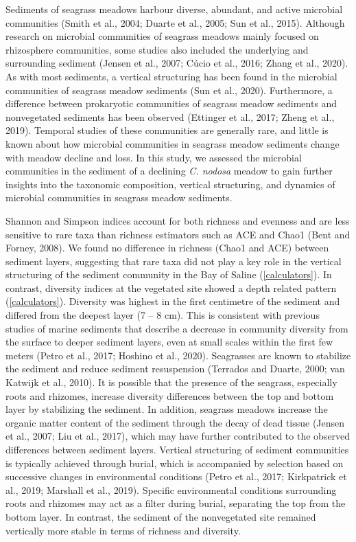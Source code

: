 \documentclass[12pt,]{article}
\begin{document}
Sediments of seagrass meadows harbour diverse, abundant, and active
microbial communities (Smith et al., 2004; Duarte et al., 2005; Sun et
al., 2015). Although research on microbial communities of seagrass
meadows mainly focused on rhizosphere communities, some studies also
included the underlying and surrounding sediment (Jensen et al., 2007;
Cúcio et al., 2016; Zhang et al., 2020). As with most sediments, a
vertical structuring has been found in the microbial communities of
seagrass meadow sediments (Sun et al., 2020). Furthermore, a difference
between prokaryotic communities of seagrass meadow sediments and
nonvegetated sediments has been observed (Ettinger et al., 2017; Zheng
et al., 2019). Temporal studies of these communities are generally rare,
and little is known about how microbial communities in seagrass meadow
sediments change with meadow decline and loss. In this study, we
assessed the microbial communities in the sediment of a declining
\emph{C. nodosa} meadow to gain further insights into the taxonomic
composition, vertical structuring, and dynamics of microbial communities
in seagrass meadow sediments.

Shannon and Simpson indices account for both richness and evenness and
are less sensitive to rare taxa than richness estimators such as ACE and
Chao1 (Bent and Forney, 2008). We found no difference in richness (Chao1
and ACE) between sediment layers, suggesting that rare taxa did not play
a key role in the vertical structuring of the sediment community in the
Bay of Saline (\autoref{calculators}). In contrast, diversity indices at
the vegetated site showed a depth related pattern
(\autoref{calculators}). Diversity was highest in the first centimetre
of the sediment and differed from the deepest layer (7 -- 8 cm). This is
consistent with previous studies of marine sediments that describe a
decrease in community diversity from the surface to deeper sediment
layers, even at small scales within the first few meters (Petro et al.,
2017; Hoshino et al., 2020). Seagrasses are known to stabilize the
sediment and reduce sediment resuspension (Terrados and Duarte, 2000;
van Katwijk et al., 2010). It is possible that the presence of the
seagrass, especially roots and rhizomes, increase diversity differences
between the top and bottom layer by stabilizing the sediment. In
addition, seagrass meadows increase the organic matter content of the
sediment through the decay of dead tissue (Jensen et al., 2007; Liu et
al., 2017), which may have further contributed to the observed
differences between sediment layers. Vertical structuring of sediment
communities is typically achieved through burial, which is accompanied
by selection based on successive changes in environmental conditions
(Petro et al., 2017; Kirkpatrick et al., 2019; Marshall et al., 2019).
Specific environmental conditions surrounding roots and rhizomes may act
as a filter during burial, separating the top from the bottom layer. In
contrast, the sediment of the nonvegetated site remained vertically more
stable in terms of richness and diversity.
\end{document}
